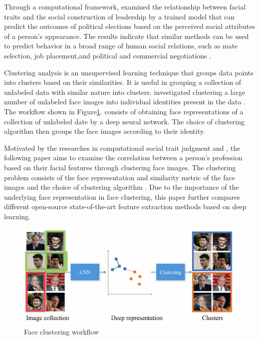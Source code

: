 \documentclass[12pt,english]{article}
\begin{document}
Through a computational framework, \cite{joo} examined the relationship between facial traits and the social construction of leadership by a trained model that can predict the outcomes of political elections based on the perceived social attributes of a person's appearance. The results indicate that similar methods can be used to predict behavior in a broad range of human social relations, such as mate selection, job placement,and political and commercial negotiations \cite{joo}.

Clustering analysis is an unsupervised learning technique that groups data points into clusters based on their similarities. It is useful in grouping a collection of unlabeled data with similar nature into clusters. \cite{shi} investigated clustering a large number of unlabeled face images into individual identities present in the data \cite{shi}. The workflow shown in Figure\ref{fig:face}. consists of obtaining face representations of a collection of unlabeled date by a deep neural network. The choice of clustering algorithm then groups the face images according to their identity.

Motivated by the researches in computational social trait judgment and \cite{shi}, the following paper aims to examine the correlation between a person's profession based on their facial features through clustering face images. The clustering problem consists of the face representation and similarity metric of the face images and the choice of clustering algorithm \cite{shi}. Due to the importance of the underlying face representation in face clustering, this paper further compares different open-source state-of-the-art feature extraction methods based on deep learning.\\

\begin{figure}[!tbp]
 \centering
    \includegraphics[width=\textwidth]{figures/otto_faceClustering_workflow.png}
    \caption{Face clustering workflow \cite{shi}}
	\label{fig:face}
\end{figure}
\end{document}
